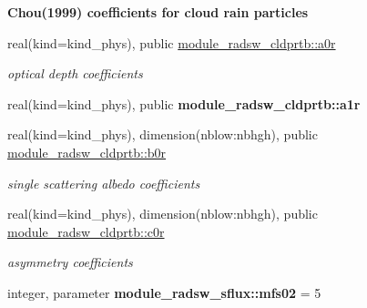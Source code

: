 \begin{Indent}\textbf{ Chou(1999) coefficients for cloud rain particles}\par
\begin{DoxyCompactItemize}
\item 
\mbox{\label{namespacemodule__radsw__cldprtb_a0fdb9425031a10735e11d7f5c9e0376e}} 
real(kind=kind\+\_\+phys), public \hyperlink{namespacemodule__radsw__cldprtb_a0fdb9425031a10735e11d7f5c9e0376e}{module\+\_\+radsw\+\_\+cldprtb\+::a0r}
\begin{DoxyCompactList}\small\item\em optical depth coefficients \end{DoxyCompactList}\item 
\mbox{\label{namespacemodule__radsw__cldprtb_a9826a0616c434620200ce4652b5af800}} 
real(kind=kind\+\_\+phys), public {\bfseries module\+\_\+radsw\+\_\+cldprtb\+::a1r}
\item 
\mbox{\label{namespacemodule__radsw__cldprtb_ac39d49e73ffa960421e36e45a35db162}} 
real(kind=kind\+\_\+phys), dimension(nblow\+:nbhgh), public \hyperlink{namespacemodule__radsw__cldprtb_ac39d49e73ffa960421e36e45a35db162}{module\+\_\+radsw\+\_\+cldprtb\+::b0r}
\begin{DoxyCompactList}\small\item\em single scattering albedo coefficients \end{DoxyCompactList}\item 
\mbox{\label{namespacemodule__radsw__cldprtb_a8927b6e7cc810301e3843eb0f5c0c795}} 
real(kind=kind\+\_\+phys), dimension(nblow\+:nbhgh), public \hyperlink{namespacemodule__radsw__cldprtb_a8927b6e7cc810301e3843eb0f5c0c795}{module\+\_\+radsw\+\_\+cldprtb\+::c0r}
\begin{DoxyCompactList}\small\item\em asymmetry coefficients \end{DoxyCompactList}\item 
\mbox{\label{namespacemodule__radsw__sflux_acca3bbc0dd125a3e8c3734c58c48e79b}} 
integer, parameter {\bfseries module\+\_\+radsw\+\_\+sflux\+::mfs02} = 5
\item 
\mbox{\label{namespacemodule__radsw__sflux_a5bd55a5106ce82bd47250d38d9b8f22a}} 

\end{DoxyCompactItemize}
\end{Indent}
